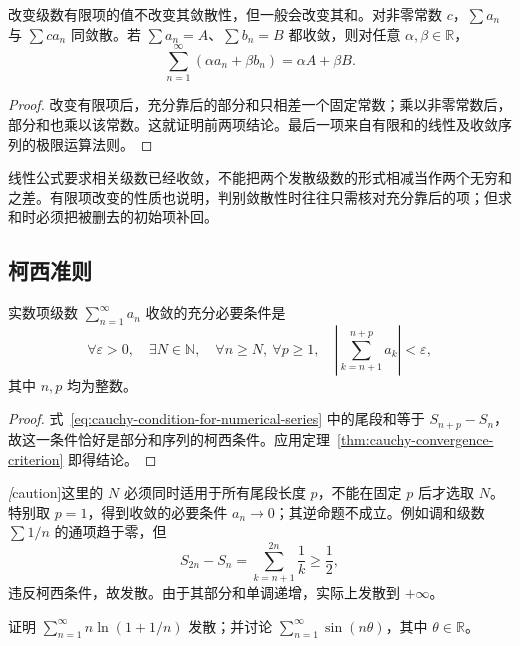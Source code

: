 \documentclass[UTF8,12pt,a4paper,fontset=fandol]{ctexbook}
\begin{document}
\begin{proposition}[有限项改变与线性运算]
\label{prop:series-finite-changes-and-linearity}
改变级数有限项的值不改变其敛散性，但一般会改变其和。对非零常数 $c$，$\sum a_n$ 与 $\sum ca_n$ 同敛散。若 $\sum a_n=A$、$\sum b_n=B$ 都收敛，则对任意 $\alpha,\beta\in\mathbb R$，
\[
    \sum_{n=1}^{\infty}(\alpha a_n+\beta b_n)=\alpha A+\beta B.
\]
\end{proposition}

\begin{proof}
改变有限项后，充分靠后的部分和只相差一个固定常数；乘以非零常数后，部分和也乘以该常数。这就证明前两项结论。最后一项来自有限和的线性及收敛序列的极限运算法则。
\end{proof}

线性公式要求相关级数已经收敛，不能把两个发散级数的形式相减当作两个无穷和之差。有限项改变的性质也说明，判别敛散性时往往只需核对充分靠后的项；但求和时必须把被删去的初始项补回。

\subsection{柯西准则}
\label{subsec:cauchy-criterion-for-series}

\begin{theorem}[级数的柯西准则]
\label{thm:cauchy-criterion-for-numerical-series}
实数项级数 $\sum_{n=1}^{\infty}a_n$ 收敛的充分必要条件是
\begin{equation}
    \forall\varepsilon>0,\quad\exists N\in\mathbb N,\quad
    \forall n\geq N,\ \forall p\geq1,\quad
    \left|\sum_{k=n+1}^{n+p}a_k\right|<\varepsilon,
    \label{eq:cauchy-condition-for-numerical-series}
\end{equation}
其中 $n,p$ 均为整数。
\end{theorem}

\begin{proof}
式~\eqref{eq:cauchy-condition-for-numerical-series} 中的尾段和等于 $S_{n+p}-S_n$，故这一条件恰好是部分和序列的柯西条件。应用定理~\ref{thm:cauchy-convergence-criterion} 即得结论。
\end{proof}

\emph[caution]{这里的 $N$ 必须同时适用于所有尾段长度 $p$，不能在固定 $p$ 后才选取 $N$。}特别取 $p=1$，得到收敛的必要条件 $a_n\to0$；其逆命题不成立。例如调和级数 $\sum1/n$ 的通项趋于零，但
\[
    S_{2n}-S_n=\sum_{k=n+1}^{2n}\frac1k\geq\frac12,
\]
违反柯西条件，故发散。由于其部分和单调递增，实际上发散到 $+\infty$。

\begin{example}
\label{ex:series-term-test-divergence}
证明 $\sum_{n=1}^{\infty}n\ln(1+1/n)$ 发散；并讨论 $\sum_{n=1}^{\infty}\sin(n\theta)$，其中 $\theta\in\mathbb R$。
\end{example}
\end{document}
